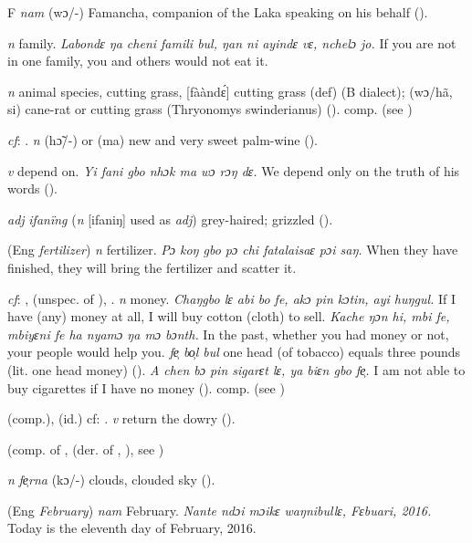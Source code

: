 \begin{letter}{F}
 \textit{nam} (wɔ/-) Famancha, companion of the Laka speaking on his behalf (\citealt{Pichl1967}). 

 \textit{n} family. \textit{Labondɛ ŋa cheni famili bul, ŋan ni ayindɛ vɛ, nchelɔ jo.} If you are not in one family, you and others would not eat it.

 \textit{n} animal species, cutting grass, [fààndɛ́] cutting grass (def) (B dialect); (wɔ/hã, si) cane-rat or cutting grass (Thryonomys swinderianus) (\citealt{Pichl1967}). comp.  (see ) 

 \textit{cf}: . \textit{n} (hɔ̃/-) or (ma) new and very sweet palm-wine (\citealt{Pichl1967}). 

 \textit{v} depend on. \textit{Yi fani gbo nhɔk ma wɔ rɔŋ dɛ.} We depend only on the truth of his words (\citealt{Pichl1967}). 

 \textit{adj} \textit{ifanïng} (\textit{n} [ifaniŋ] used as \textit{adj}) grey-haired; grizzled (\citealt{Pichl1967}). 

 (Eng \textit{fertilizer}) \textit{n} fertilizer. \textit{Pɔ koŋ gbo pɔ chi fatalaisaɛ pɔi saŋ.} When they have finished, they will bring the fertilizer and scatter it.

 \textit{cf}: ,  (unspec. of ), . \textit{n} money. \textit{Chaŋgbo lɛ abi bo fe, akɔ pin kɔtin, ayi huŋgul.} If I have (any) money at all, I will buy cotton (cloth) to sell. \textit{Kache ŋɔn hi, mbi fe, mbiyɛni fe ha nyamɔ ŋa mɔ bɔnth.} In the past, whether you had money or not, your people would help you. \textit{fe̹ bo̹l bul} one head (of tobacco) equals three pounds (lit. one head money) (\citealt{Pichl1967}). \textit{A chen bɔ pin sigarɛt lɛ, ya biɛn gbo fe̹.} I am not able to buy cigarettes if I have no money (\citealt{Pichl1967}). comp.  (see ) 

 (comp.), (id.) cf: . \textit{v} return the dowry (\citealt{Pichl1967}).

 (comp. of ,  (der. of , ), see ) 

 \textit{n} \textit{fe̹rna} (kɔ/-) clouds, clouded sky (\citealt{Pichl1967}). 

 (Eng \textit{February}) \textit{nam} February. \textit{Nante ndɔi mɔikɛ waŋnibullɛ, Fɛbuari, 2016.} Today is the eleventh day of February, 2016.


\end{letter}
